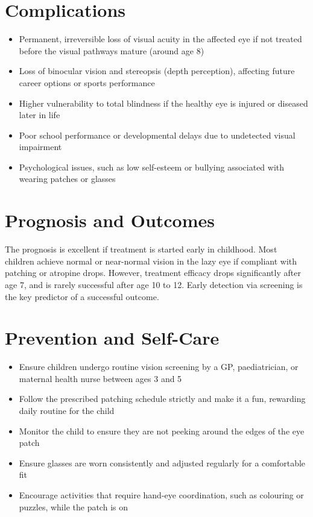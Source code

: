 \section*{Complications}
\begin{itemize}
    \item Permanent, irreversible loss of visual acuity in the affected eye if not treated before the visual pathways mature (around age 8)
    \item Loss of binocular vision and stereopsis (depth perception), affecting future career options or sports performance
    \item Higher vulnerability to total blindness if the healthy eye is injured or diseased later in life
    \item Poor school performance or developmental delays due to undetected visual impairment
    \item Psychological issues, such as low self-esteem or bullying associated with wearing patches or glasses
\end{itemize}

\section*{Prognosis and Outcomes}
The prognosis is excellent if treatment is started early in childhood. Most children achieve normal or near-normal vision in the lazy eye if compliant with patching or atropine drops. However, treatment efficacy drops significantly after age 7, and is rarely successful after age 10 to 12. Early detection via screening is the key predictor of a successful outcome.

\section*{Prevention and Self-Care}
\begin{itemize}
    \item Ensure children undergo routine vision screening by a GP, paediatrician, or maternal health nurse between ages 3 and 5
    \item Follow the prescribed patching schedule strictly and make it a fun, rewarding daily routine for the child
    \item Monitor the child to ensure they are not peeking around the edges of the eye patch
    \item Ensure glasses are worn consistently and adjusted regularly for a comfortable fit
    \item Encourage activities that require hand-eye coordination, such as colouring or puzzles, while the patch is on
\end{itemize}

